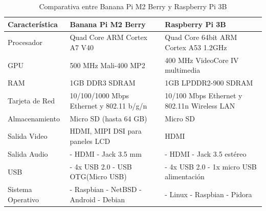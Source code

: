 \pagebreak
\begin{longtable}{|M{3.0cm}|M{4.5cm}|M{4.5cm}|}
    \caption{Comparativa entre Banana Pi M2 Berry y Raspberry Pi 3B}
	\hline
	\textbf{Característica} & \textbf{Banana Pi M2 Berry} & \textbf{Raspberry Pi 3B} \\ 
	\hline
 	Procesador & Quad Core ARM Cortex A7 V40 & Quad Core 64bit ARM Cortex A53 1.2GHz \\
 	\hline
    GPU & 500 MHz Mali-400 MP2 & 400 MHz VideoCore IV multimedia\\
    \hline
    RAM & 1GB DDR3 SDRAM & 1GB LPDDR2-900 SDRAM \\
	\hline
	Tarjeta de Red & 10/100/1000 Mbps Ethernet y 802.11 b/g/n & 10/100 Mbps Ethernet y 802.11n Wireless LAN\\
	\hline
	Almacenamiento & Micro SD (hasta 64 GB) & Micro SD\\
	\hline
	Salida Video & HDMI, MIPI DSI para paneles LCD & HDMI\\
    \hline
    Salida Audio 
    & 
    \newline - HDMI 
    \newline - Jack 3.5 mm 
    & 
    \newline - HDMI
    \newline - Jack 3.5 estéreo \\
    \hline
    USB & 
    \newline - 4x USB 2.0 
    \newline - USB OTG(Micro USB) 
    & 
    \newline - 4x USB 2.0
    \newline - 1x micro USB alimentación \\
    \hline
    Sistema Operativo 
    & 
    \newline - Raspbian
    \newline - NetBSD
    \newline - Android
    \newline - Debian 
    &
    \newline - Linux
    \newline - Raspbian
    \newline - Pidora \\
    \hline
	
\end{longtable}


